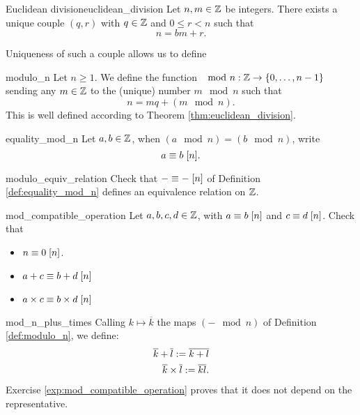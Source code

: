 \begin{cthm}{Euclidean division}{euclidean_division}
    Let \( n, m \in \mathbb{Z} \) be integers. There exists a unique couple \( (q, r) \) with \( q \in \mathbb{Z} \) and \( 0 \le r < n \) such that 
    \begin{equation*}
        n = bm + r.
    \end{equation*}
\end{cthm}

Uniqueness of such a couple allows us to define 
\begin{cdef}{}{modulo_n}
    Let \( n \geq 1 \). We define the function \( \mod n : \mathbb{Z} \to \{ 0, \dots, n-1 \} \) sending any \( m \in \mathbb{Z} \) to the (unique) number \( m \mod n \) such that 
    \begin{equation*}
        n = mq + (m \mod n).
    \end{equation*}
    This is well defined according to Theorem \ref{thm:euclidean_division}.
\end{cdef}

\begin{cdef}{}{equality_mod_n}
    Let \( a, b \in \mathbb{Z} \), when \( (a \mod n) = (b \mod n) \), write
    \begin{equation*}
        a \equiv b \;[{n}].
    \end{equation*}
\end{cdef}

\begin{cex}{}{modulo_equiv_relation}
    Check that \( - \equiv - \;[{n}] \) of Definition \ref{def:equality_mod_n} defines an equivalence relation on \( \mathbb{Z} \). 
\end{cex}

\begin{cexp}{}{mod_compatible_operation}
    Let \( a, b, c, d \in \mathbb{Z} \), with \( a \equiv b \;[{n}] \) and \( c \equiv d \;[{n}] \). Check that
    \begin{itemize}
        \item \( n \equiv 0 \;[{n}] \).
        \item \( a + c \equiv b + d \;[{n}] \) 
        \item \( a \times c \equiv b \times d \;[{n}] \)
    \end{itemize}
\end{cexp}

\begin{cdef}{}{mod_n_plus_times}
    Calling \( k \mapsto \overline k \) the maps \( (- \mod n) \) of Definition \ref{def:modulo_n}, we define:
    \begin{align*}
        \overline k + \overline l := \overline {k + l} \\
        \overline k \times \overline l := \overline {kl}.
    \end{align*}
    Exercise \ref{exp:mod_compatible_operation} proves that it does not depend on the representative.  
\end{cdef}



